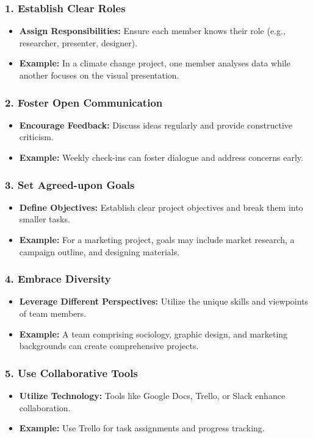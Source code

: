 \documentclass[aspectratio=169]{beamer}
\begin{document}
\begin{frame}[fragile]
    \frametitle{1. Establish Clear Roles}
    \begin{itemize}
        \item \textbf{Assign Responsibilities:} Ensure each member knows their role (e.g., researcher, presenter, designer).
        \item \textbf{Example:} In a climate change project, one member analyses data while another focuses on the visual presentation.
    \end{itemize}
\end{frame}

\begin{frame}[fragile]
    \frametitle{2. Foster Open Communication}
    \begin{itemize}
        \item \textbf{Encourage Feedback:} Discuss ideas regularly and provide constructive criticism.
        \item \textbf{Example:} Weekly check-ins can foster dialogue and address concerns early.
    \end{itemize}
\end{frame}

\begin{frame}[fragile]
    \frametitle{3. Set Agreed-upon Goals}
    \begin{itemize}
        \item \textbf{Define Objectives:} Establish clear project objectives and break them into smaller tasks.
        \item \textbf{Example:} For a marketing project, goals may include market research, a campaign outline, and designing materials.
    \end{itemize}
\end{frame}

\begin{frame}[fragile]
    \frametitle{4. Embrace Diversity}
    \begin{itemize}
        \item \textbf{Leverage Different Perspectives:} Utilize the unique skills and viewpoints of team members.
        \item \textbf{Example:} A team comprising sociology, graphic design, and marketing backgrounds can create comprehensive projects.
    \end{itemize}
\end{frame}

\begin{frame}[fragile]
    \frametitle{5. Use Collaborative Tools}
    \begin{itemize}
        \item \textbf{Utilize Technology:} Tools like Google Docs, Trello, or Slack enhance collaboration.
        \item \textbf{Example:} Use Trello for task assignments and progress tracking.
    \end{itemize}
\end{frame}
\end{document}

